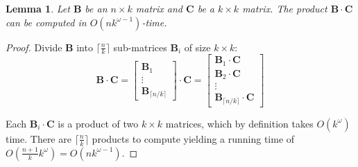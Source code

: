 \documentclass[10pt,a4paper]{article}
\newtheorem{lemma}[theorem]{Lemma}
\newcommand{\matsize}[2]{#1\times #2}
\newcommand{\matexp}{\omega}
\newcommand{\mat}[1]{\mathbf{#1}}
\begin{document}
\begin{lemma}\label{lem:block_multiplication}
	Let $\mat{B}$ be an $\matsize{n}{k}$ matrix and $\mat{C}$ be a $\matsize{k}{k}$  matrix. The product $\mat{B}\cdot \mat{C}$ can be computed in $O(nk^{\matexp-1})$-time.
\end{lemma}
\begin{proof}
	Divide $\mat{B}$ into $\lceil \frac{n}{k}\rceil$ sub-matrices $\mat{B}_i$ of size $\matsize{k}{k}$:
 \[ \mat{B}\cdot \mat{C} = \begin{bmatrix} 
\mat{B}_1 \\ \vdots \\ \mat{B}_{\lceil n/k \rceil} 
 \end{bmatrix} \cdot \mat{C} = \begin{bmatrix} 
 \mat{B}_1\cdot \mat{C} \\ \mat{B}_2\cdot \mat{C} \\ \vdots \\ \mat{B}_{\lceil n/k \rceil} \cdot \mat{C}
 \end{bmatrix}  \]
	
	Each $\mat{B}_i \cdot \mat{C}$ is a product of two $\matsize{k}{k}$ matrices, which by definition takes $O(k^{\matexp})$ time.  There are $\lceil\frac{n}{k}\rceil$ products to compute yielding a running time of $O\left(\frac{n+1}{k} k^\matexp\right ) = O(n k^{\matexp-1})$.
\end{proof}
\end{document}
